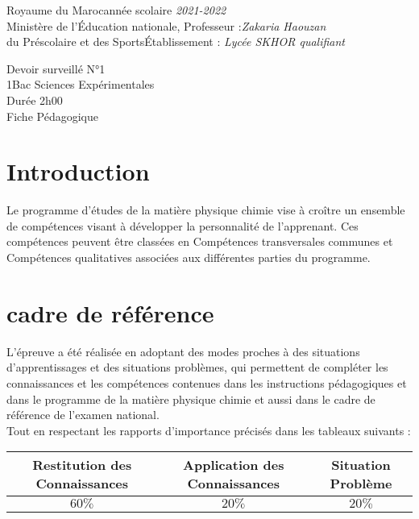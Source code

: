 \documentclass[12pt]{article}
\newcommand\headerMe[2]{\noindent{}#1\hfill#2}
\begin{document}
\headerMe{Royaume du Maroc}{année scolaire \emph{2021-2022}}\\
\headerMe{Ministère de l'Éducation nationale, }{  Professeur :\emph{Zakaria Haouzan}}\\
\headerMe{du Préscolaire et des Sports}{Établissement : \emph{Lycée SKHOR qualifiant}}\\

\begin{center}
Devoir surveillé N°1 \\
1Bac Sciences Expérimentales\\
Durée 2h00
\\
    \vspace{.2cm}
\hrulefill
\Large{Fiche Pédagogique}
\hrulefill\\
\end{center}


\section[A]{Introduction }
\hspace{0.5cm}Le programme d'études de la matière physique chimie vise à croître un ensemble de compétences visant à développer la personnalité de l'apprenant. Ces compétences peuvent être classées en Compétences transversales communes et Compétences qualitatives associées aux différentes parties du programme.
\section{cadre de référence }
 \hspace{0.5cm}L'épreuve a été réalisée en adoptant des modes proches à des situations d'apprentissages et des situations problèmes, qui permettent de compléter les connaissances et les compétences contenues dans les instructions pédagogiques et dans le programme de la matière physique chimie et aussi dans le cadre de référence de l'examen national. 
 \\Tout en respectant les rapports d'importance précisés dans les tableaux suivants :
 \begin{center}
\begin{tabular}{|c||c||c|}
\hline
    \textbf{Restitution des Connaissances} & \textbf{Application des Connaissances} & \textbf{Situation Problème }\\
    \hline
    $60\%$ & $20\%$ & $20\%$\\
    \hline
\end{tabular} 
\end{center}
\end{document}
